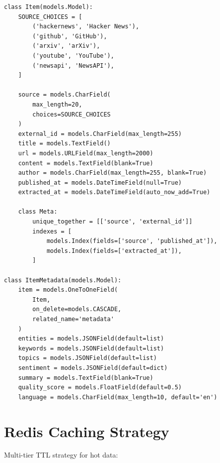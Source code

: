 \documentclass[12pt,a4paper]{report}
\begin{document}
\begin{lstlisting}
class Item(models.Model):
    SOURCE_CHOICES = [
        ('hackernews', 'Hacker News'),
        ('github', 'GitHub'),
        ('arxiv', 'arXiv'),
        ('youtube', 'YouTube'),
        ('newsapi', 'NewsAPI'),
    ]
    
    source = models.CharField(
        max_length=20,
        choices=SOURCE_CHOICES
    )
    external_id = models.CharField(max_length=255)
    title = models.TextField()
    url = models.URLField(max_length=2000)
    content = models.TextField(blank=True)
    author = models.CharField(max_length=255, blank=True)
    published_at = models.DateTimeField(null=True)
    extracted_at = models.DateTimeField(auto_now_add=True)
    
    class Meta:
        unique_together = [['source', 'external_id']]
        indexes = [
            models.Index(fields=['source', 'published_at']),
            models.Index(fields=['extracted_at']),
        ]

class ItemMetadata(models.Model):
    item = models.OneToOneField(
        Item,
        on_delete=models.CASCADE,
        related_name='metadata'
    )
    entities = models.JSONField(default=list)
    keywords = models.JSONField(default=list)
    topics = models.JSONField(default=list)
    sentiment = models.JSONField(default=dict)
    summary = models.TextField(blank=True)
    quality_score = models.FloatField(default=0.5)
    language = models.CharField(max_length=10, default='en')
\end{lstlisting}

\section{Redis Caching Strategy}

Multi-tier TTL strategy for hot data:
\end{document}
